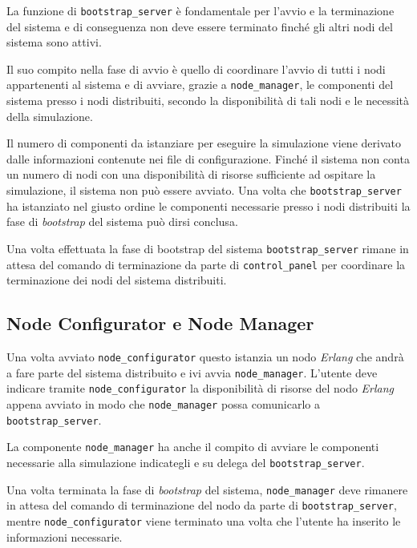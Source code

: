 \documentclass[11pt,a4paper]{report}
\newcommand{\Erlang}{\textsl{Erlang}}
\begin{document}
La funzione di \texttt{bootstrap\_server} è fondamentale per l'avvio e la terminazione del sistema e di conseguenza non deve essere terminato finché gli altri nodi del sistema sono attivi.

Il suo compito nella fase di avvio è quello di coordinare l'avvio di tutti i nodi appartenenti al sistema e di avviare, grazie a \texttt{node\_manager}, le componenti del sistema presso i nodi distribuiti, secondo la disponibilità di tali nodi e le necessità della simulazione.

Il numero di componenti da istanziare per eseguire la simulazione viene derivato dalle informazioni contenute nei file di configurazione. Finché il sistema non conta un numero di nodi con una disponibilità di risorse sufficiente ad ospitare la simulazione, il sistema non può essere avviato.
Una volta che \texttt{bootstrap\_server} ha istanziato nel giusto ordine le componenti necessarie presso i nodi distribuiti la fase di \textit{bootstrap} del sistema può dirsi conclusa.

Una volta effettuata la fase di bootstrap del sistema \texttt{bootstrap\_server} rimane in attesa del comando di terminazione da parte di \texttt{control\_panel} per coordinare la terminazione dei nodi del sistema distribuiti.

\subsection*{Node Configurator e Node Manager}
Una volta avviato \texttt{node\_configurator} questo istanzia un nodo \Erlang{} che andrà a fare parte del sistema distribuito e ivi avvia \texttt{node\_manager}. L'utente deve indicare tramite \texttt{node\_configurator} la disponibilità di risorse del nodo \Erlang{} appena avviato in modo che \texttt{node\_manager} possa comunicarlo a \texttt{bootstrap\_server}.

La componente \texttt{node\_manager} ha anche il compito di avviare le componenti necessarie alla simulazione indicategli e su delega del \texttt{bootstrap\_server}.

Una volta terminata la fase di \textit{bootstrap} del sistema, \texttt{node\_manager} deve rimanere in attesa del comando di terminazione del nodo da parte di \texttt{bootstrap\_server}, mentre \texttt{node\_configurator} viene terminato una volta che l'utente ha inserito le informazioni necessarie.
\end{document}
